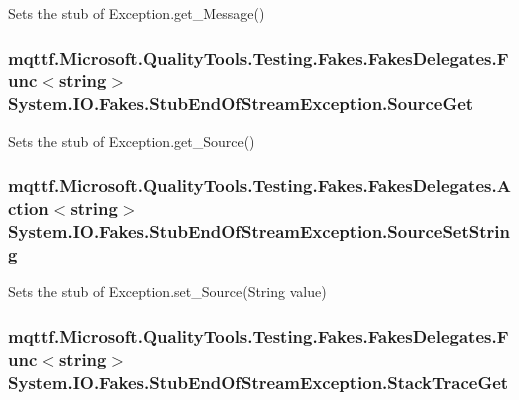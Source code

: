 Sets the stub of Exception.\-get\-\_\-\-Message()

\hypertarget{class_system_1_1_i_o_1_1_fakes_1_1_stub_end_of_stream_exception_a7d10cbce210ae287050fec5a561e0597}{
\subsubsection[{Source\-Get}]{\setlength{\rightskip}{0pt plus 5cm}mqttf.\-Microsoft.\-Quality\-Tools.\-Testing.\-Fakes.\-Fakes\-Delegates.\-Func$<$string$>$ System.\-I\-O.\-Fakes.\-Stub\-End\-Of\-Stream\-Exception.\-Source\-Get}}\label{class_system_1_1_i_o_1_1_fakes_1_1_stub_end_of_stream_exception_a7d10cbce210ae287050fec5a561e0597}


Sets the stub of Exception.\-get\-\_\-\-Source()

\hypertarget{class_system_1_1_i_o_1_1_fakes_1_1_stub_end_of_stream_exception_a83269b255606d62c8956591705724d1e}{
\subsubsection[{Source\-Set\-String}]{\setlength{\rightskip}{0pt plus 5cm}mqttf.\-Microsoft.\-Quality\-Tools.\-Testing.\-Fakes.\-Fakes\-Delegates.\-Action$<$string$>$ System.\-I\-O.\-Fakes.\-Stub\-End\-Of\-Stream\-Exception.\-Source\-Set\-String}}\label{class_system_1_1_i_o_1_1_fakes_1_1_stub_end_of_stream_exception_a83269b255606d62c8956591705724d1e}


Sets the stub of Exception.\-set\-\_\-\-Source(\-String value)

\hypertarget{class_system_1_1_i_o_1_1_fakes_1_1_stub_end_of_stream_exception_a8b5a5a1ed2450c08f9a0b1c5adf403b6}{
\subsubsection[{Stack\-Trace\-Get}]{\setlength{\rightskip}{0pt plus 5cm}mqttf.\-Microsoft.\-Quality\-Tools.\-Testing.\-Fakes.\-Fakes\-Delegates.\-Func$<$string$>$ System.\-I\-O.\-Fakes.\-Stub\-End\-Of\-Stream\-Exception.\-Stack\-Trace\-Get}}\label{class_system_1_1_i_o_1_1_fakes_1_1_stub_end_of_stream_exception_a8b5a5a1ed2450c08f9a0b1c5adf403b6}


